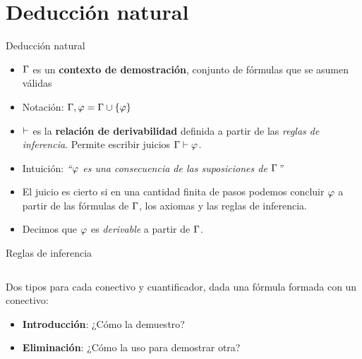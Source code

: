 \documentclass[xcolor={dvipsnames},spanish]{beamer}
\begin{document}
\section{Deducción natural}

\begin{frame}{Deducción natural}
    \begin{definitions}
        \begin{itemize}
            \item $\Gamma$ es un \textbf{contexto de demostración}, conjunto de
            fórmulas que se asumen válidas
            \item Notación: $\Gamma, \varphi = \Gamma \cup \{\varphi\}$
            \item $\vdash$ es la \textbf{relación de derivabilidad} definida a
            partir de las \textit{reglas de inferencia}. Permite escribir
            juicios $\Gamma \vdash \varphi$.
            \item Intuición: \textit{``$\varphi$ es
            una consecuencia de las suposiciones de $\Gamma$''}
            \item El juicio es cierto si en una cantidad finita de
            pasos podemos concluir $\varphi$ a partir de las fórmulas de
            $\Gamma$, los axiomas y las reglas de inferencia.
            \item Decimos que
            $\varphi$ es \textit{derivable} a partir de $\Gamma$.
        \end{itemize}
    \end{definitions}
\end{frame}

\begin{frame}{Reglas de inferencia}
    \begin{definition}
        \begin{columns}
            \proofTreeAx
            \proofTreeImpI
            \proofTreeImpE
            \proofTreeAndI
            \proofTreeAndEOne
            \proofTreeAndETwo
        \end{columns}
        
    \end{definition}
    Dos tipos para cada conectivo y cuantificador, dada una fórmula formada con un conectivo:
    \begin{itemize}
        \item \textbf{Introducción}: ¿Cómo la demuestro?
        \item \textbf{Eliminación}: ¿Cómo la uso para demostrar otra?
    \end{itemize}
\end{frame}
\end{document}
